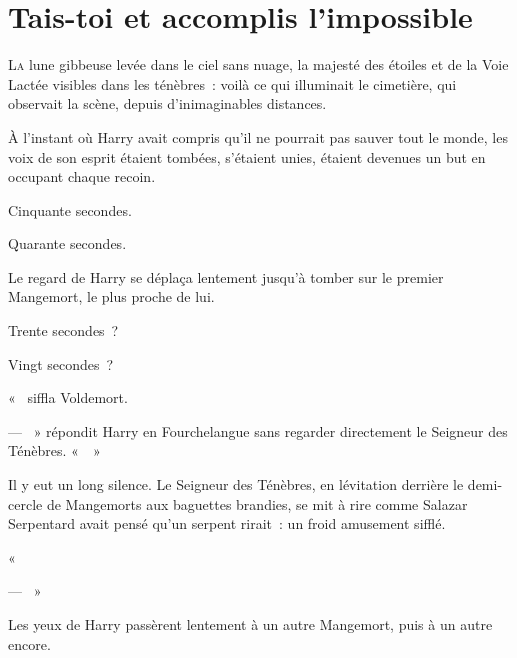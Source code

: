 \chapter{Tais-toi et accomplis l'impossible}

\lettrine{L}{a} lune gibbeuse levée dans le ciel sans nuage, la majesté des étoiles et de la Voie Lactée visibles dans les ténèbres~: voilà ce qui illuminait le cimetière, qui observait la scène, depuis d'inimaginables distances.

À l'instant où Harry avait compris qu'il ne pourrait pas sauver tout le monde, les voix de son esprit étaient tombées, s'étaient unies, étaient devenues un but en occupant chaque recoin.

Cinquante secondes.

Quarante secondes.

Le regard de Harry se déplaça lentement jusqu'à tomber sur le premier Mangemort, le plus proche de lui.

Trente secondes~?

Vingt secondes~?

«~ siffla Voldemort.

--- ~» répondit Harry en Fourchelangue sans regarder directement le Seigneur des Ténèbres. «~~»

Il y eut un long silence. Le Seigneur des Ténèbres, en lévitation derrière le demi-cercle de Mangemorts aux baguettes brandies, se mit à rire comme Salazar Serpentard avait pensé qu'un serpent rirait~: un froid amusement sifflé.

«~

--- ~»

Les yeux de Harry passèrent lentement à un autre Mangemort, puis à un autre encore.

